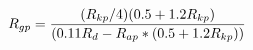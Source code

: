 \hsize 0pt
\vsize 0pt
\nopagenumbers
\overfullrule 0pt
\noindent
$$
R_{gp} = {(R_{kp}/4)(0.5 + 1.2R_{kp})\over
(0.11R_d - R_{ap}*(0.5+1.2R_{kp}))}
$$
\bye
